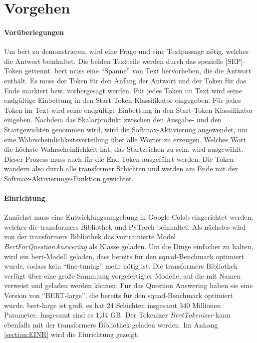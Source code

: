 \documentclass[
        ngerman,
        paper=a4,
        numbers=noendperiod,
]{scrreprt}
\begin{document}
\section{Vorgehen}


\paragraph{Vorüberlegungen}
Um \ac{bert} zu demonstrieren, wird eine Frage und eine Textpassage nötig, welches die Antwort beinhaltet. Die beiden Textteile werden durch das spezielle [SEP]-Token getrennt. \ac{bert} muss eine \enquote{Spanne} von Text hervorheben, die die Antwort enthält. Es muss der Token für den Anfang der Antwort und der Token für das Ende markiert bzw. vorhergesagt werden. Für jedes Token im Text wird seine endgültige Einbettung in den Start-Token-Klassifikator eingegeben. Für jedes Token im Text wird seine endgültige Einbettung in den Start-Token-Klassifikator eingeben. Nachdem das Skalarprodukt zwischen den Ausgabe- und den Startgewichten genommen wird, wird die Softmax-Aktivierung angewendet, um eine Wahrscheinlichkeitsverteilung über alle Wörter zu erzeugen. Welches Wort die höchste Wahrscheinlichkeit hat, das Startzeichen zu sein, wird ausgewählt. Dieser Prozess muss auch für die End-Token ausgeführt werden. Die Token wandern also durch alle transformer Schichten und werden am Ende mit der Softmax-Aktivierungs-Funktion gewichtet.


\paragraph{Einrichtung}
Zunächst muss eine Entwicklungsumgebung in Google Colab eingerichtet werden, welches die transformers Bibliothek und PyTorch beinhaltet. Als nächstes wird von der transformers Bibliothek das vortrainierte Model \textit{BertForQuestionAnswering} als Klasse geladen. Um die Dinge einfacher zu halten, wird ein \ac{bert}-Modell geladen, dass bereits für den \ac{squad}-Benchmark optimiert wurde, sodass kein \enquote{fine-tuning} mehr nötig ist. Die transformers Bibliothek verfügt über eine große Sammlung vorgefertigter Modelle, auf die mit Namen verweist und geladen werden können. Für das Question Answering haben sie eine Version von \enquote{BERT-large}, die bereits für den \ac{squad}-Benchmark optimiert wurde. \ac{bert}-large ist groß, es hat 24 Schichten insgesamt 340 Millionen Parameter. Insgesamt sind es 1,34 GB. Der Tokenizer \textit{BertTokenizer} kann ebenfalls mit der transformers Bibliothek geladen werden. Im Anhang \ref{section:EINR} wird die Einrichtung gezeigt.
\end{document}
